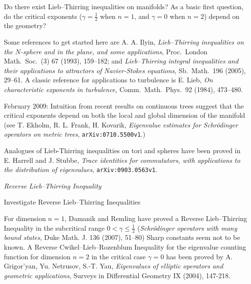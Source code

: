 \documentclass[12pt,letterpaper, reqno]{amsart}
\begin{document}
\begin{problemblock}

\begin{problem}
 Do there exist Lieb--Thirring inequalities on manifolds?
As a basic first question, do the critical exponents
($\gamma=\frac{1}{2}$ when $n=1$, and $\gamma=0$ when $n=2$) depend
on the geometry?
\end{problem}

\begin{remark}
Some references to get started here are A. A. Ilyin,
\emph{Lieb--Thirring inequalities on the $N$-sphere and in the
plane, and some applications}, Proc.\ London Math.\ Soc.\ (3) 67
(1993), 159--182; and \emph{Lieb--Thirring integral inequalities and
their applications to attractors of Navier-Stokes equations}, Sb.\
Math.\ 196 (2005), 29--61. A classic reference for applications to
turbulence is E. Lieb, \emph{On characteristic exponents in
turbulence}, Comm.\ Math.\ Phys.\ 92 (1984), 473--480.
\end{remark}

\begin{remark}
February 2009: Intuition from recent results on continuous trees
suggest that the critical exponents depend on both the local and global
dimension of the manifold (see T. Ekholm, R. L. Frank, H. Kovarik,
\emph{Eigenvalue estimates for Schr\"odinger operators on metric trees},
\texttt{arXiv:0710.5500v1}.)
\end{remark}

\begin{remark}
Analogues of Lieb-Thirring inequalities on tori and spheres have been proved in E. Harrell and J. Stubbe, \emph{Trace identities for commutators, with applications to the distribution of eigenvalues},    \texttt{arXiv:0903.0563v1}.
\end{remark}

\end{problemblock}


\begin{problemblock}
\emph{Reverse Lieb–Thirring Inequality} 
\begin{problem}
Investigate Reverse Lieb--Thirring Inequalities
\end{problem}

For dimension $n=1$, Damanik and Remling have proved a
Reverse Lieb--Thirring Inequality in the subcritical range $0 <
\gamma \leq \frac{1}{2}$ (\emph{Schr\"odinger operators
with many bound states}, Duke Math. J. 136 (2007), 51--80) Sharp constants
seem not to be known. A Reverse
Cwikel--Lieb--Rozenblum Inequality for the eigenvalue counting function for dimension $n=2$ in the critical case $\gamma=0$ has been proved by A. Grigor'yan, Yu. Netrusov, S.-T. Yau, \emph{Eigenvalues of elliptic operators and geometric applications}, Surveys in Differential Geometry IX (2004), 147-218.

\end{problemblock}
\end{document}
